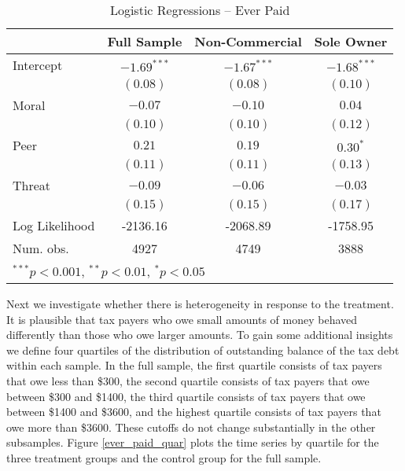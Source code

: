 \documentclass[12pt,titlepage]{article}
\begin{document}
\begin{table}[htbp]
\caption{Logistic Regressions -- Ever Paid}\label{XX}
\begin{center}
\begin{tabular}{l c c c }
\hline
               & Full Sample & Non-Commercial & Sole Owner \\
\hline
Intercept      & $-1.69^{***}$ & $-1.67^{***}$ & $-1.68^{***}$ \\
               & $(0.08)$      & $(0.08)$      & $(0.10)$      \\
Moral          & $-0.07$       & $-0.10$       & $0.04$        \\
               & $(0.10)$      & $(0.10)$      & $(0.12)$      \\
Peer           & $0.21$        & $0.19$        & $0.30^{*}$    \\
               & $(0.11)$      & $(0.11)$      & $(0.13)$      \\
Threat         & $-0.09$       & $-0.06$       & $-0.03$       \\
               & $(0.15)$      & $(0.15)$      & $(0.17)$      \\
\hline
Log Likelihood & -2136.16      & -2068.89      & -1758.95      \\
Num. obs.      & 4927          & 4749          & 3888          \\
\hline
\multicolumn{4}{l}{\scriptsize{$^{***}p<0.001$, $^{**}p<0.01$, $^*p<0.05$}}
\end{tabular}
\end{center}
\end{table}

Next we investigate whether there is heterogeneity in response to the
treatment. It is plausible that tax payers who owe small amounts of
money behaved differently than those who owe larger amounts. To gain
some additional insights we define four quartiles of the distribution
of outstanding balance of the tax debt within each sample.
In the full sample, the first quartile consists of
tax payers that owe less than \$300, the second quartile consists of
tax payers that owe between \$300 and \$1400, the third quartile
consists of tax payers that owe between \$1400 and \$3600, and the highest
quartile consists of tax payers that owe more than \$3600.
These cutoffs do not change substantially in the other subsamples. 
Figure \ref{ever_paid_quar} plots the time series by quartile for the
three treatment groups and the control group for the full sample.
\end{document}
